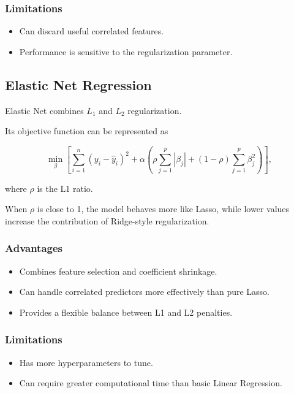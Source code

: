 \documentclass[12pt,a4paper]{article}
\begin{document}
\subsubsection{Limitations}

\begin{itemize}
    \item Can discard useful correlated features.
    \item Performance is sensitive to the regularization parameter.
\end{itemize}

\subsection{Elastic Net Regression}

Elastic Net combines $L_1$ and $L_2$ regularization.

Its objective function can be represented as

\[
\min_{\beta}
\left[
\sum_{i=1}^{n}
(y_i-\hat{y}_i)^2
+
\alpha
\left(
\rho\sum_{j=1}^{p}|\beta_j|
+
(1-\rho)\sum_{j=1}^{p}\beta_j^2
\right)
\right],
\]

where $\rho$ is the L1 ratio.

When $\rho$ is close to 1, the model behaves more like Lasso, while lower
values increase the contribution of Ridge-style regularization.

\subsubsection{Advantages}

\begin{itemize}
    \item Combines feature selection and coefficient shrinkage.
    \item Can handle correlated predictors more effectively than pure
    Lasso.
    \item Provides a flexible balance between L1 and L2 penalties.
\end{itemize}

\subsubsection{Limitations}

\begin{itemize}
    \item Has more hyperparameters to tune.
    \item Can require greater computational time than basic Linear
    Regression.
\end{itemize}
\end{document}
